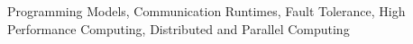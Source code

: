 \begin{center}
Programming Models,
Communication Runtimes,
Fault Tolerance,
High Performance Computing,
Distributed and Parallel Computing
\end{center}
